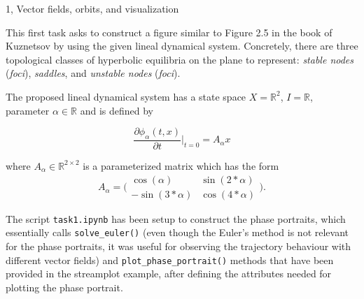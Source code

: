 \documentclass[10pt,a4paper]{article}
\begin{document}
\frontpage

\begin{task}{1, Vector fields, orbits, and visualization}

This first task asks to construct a figure similar to Figure 2.5 in the book of Kuznetsov \cite{Yuri} by using the given lineal dynamical system. Concretely, there are three topological classes of hyperbolic equilibria on the plane to represent: \textit{stable nodes} (\textit{foci}), \textit{saddles}, and \textit{unstable nodes} (\textit{foci}).

The proposed lineal dynamical system has a state space $X=\mathbb{R}^2$, $I=\mathbb{R}$, parameter $\alpha\in\mathbb{R}$ and is defined by

\begin{equation}\label{eq:lineal}
    \frac{\partial\phi_{\alpha}(t,x)}{\partial t}\Bigr|_{t=0}=A_{\alpha}x
\end{equation}

\noindent where $A_{\alpha}\in\mathbb{R}^{2\times2}$ is a parameterized matrix which has the form
\begin{equation}\label{A}
    A_{\alpha}=\big(\begin{smallmatrix}
    {\cos(\alpha)} & {\sin(2*\alpha)}\\
    {-\sin(3*\alpha)} & {\cos(4*\alpha)}
    \end{smallmatrix}\big).
\end{equation}

The script \texttt{task1.ipynb} has been setup to construct the phase portraits, which essentially calls \texttt{solve\_euler()} (even though the Euler's method is not relevant for the phase portraits, it was useful for observing the trajectory behaviour with different vector fields) and \texttt{plot\_phase\_portrait()} methods that have been provided in the streamplot example, after defining the attributes needed for plotting the phase portrait.


\end{task}
\end{document}

